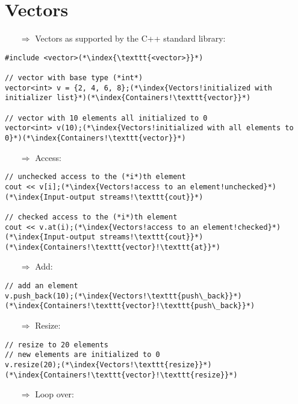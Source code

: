 \documentclass[10pt]{article}
\begin{document}
\section{Vectors}
\small
\begin{enumerate}
\item[$\Rightarrow$] Vectors as supported by the C++ standard library:
\end{enumerate}
\begin{lstlisting}
#include <vector>(*\index{\texttt{<vector>}}*)

// vector with base type (*int*)
vector<int> v = {2, 4, 6, 8};(*\index{Vectors!initialized with initializer list}*)(*\index{Containers!\texttt{vector}}*)

// vector with 10 elements all initialized to 0
vector<int> v(10);(*\index{Vectors!initialized with all elements to 0}*)(*\index{Containers!\texttt{vector}}*)
\end{lstlisting}
\begin{enumerate}
\item[$\Rightarrow$] Access:
\end{enumerate}
\begin{lstlisting}
// unchecked access to the (*i*)th element
cout << v[i];(*\index{Vectors!access to an element!unchecked}*)(*\index{Input-output streams!\texttt{cout}}*)

// checked access to the (*i*)th element
cout << v.at(i);(*\index{Vectors!access to an element!checked}*)(*\index{Input-output streams!\texttt{cout}}*)(*\index{Containers!\texttt{vector}!\texttt{at}}*)
\end{lstlisting}
\begin{enumerate}
\item[$\Rightarrow$] Add:
\end{enumerate}
\begin{lstlisting}
// add an element
v.push_back(10);(*\index{Vectors!\texttt{push\_back}}*)(*\index{Containers!\texttt{vector}!\texttt{push\_back}}*)
\end{lstlisting}
\begin{enumerate}
\item[$\Rightarrow$] Resize:
\end{enumerate}
\begin{lstlisting}
// resize to 20 elements
// new elements are initialized to 0
v.resize(20);(*\index{Vectors!\texttt{resize}}*)(*\index{Containers!\texttt{vector}!\texttt{resize}}*)
\end{lstlisting}
\begin{enumerate}
\item[$\Rightarrow$] Loop over:
\end{enumerate}
\end{document}
